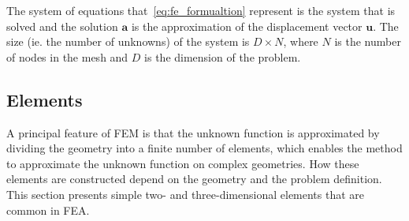The system of equations that~\eqref{eq:fe_formualtion} represent is the system that is solved and the solution $\mathbf{a}$ is the approximation of the displacement vector $\mathbf{u}$. The size (ie. the number of unknowns) of the system is $D\times N$, where $N$ is the number of nodes in the mesh and $D$ is the dimension of the problem.

\subsection{Elements} %
\label{sub:elements}
A principal feature of FEM is that the unknown function is approximated by dividing the geometry into a finite number of elements, which enables the method to approximate the unknown function on complex geometries. How these elements are constructed depend on the geometry and the problem definition. This section presents simple two- and three-dimensional elements that are common in FEA.

